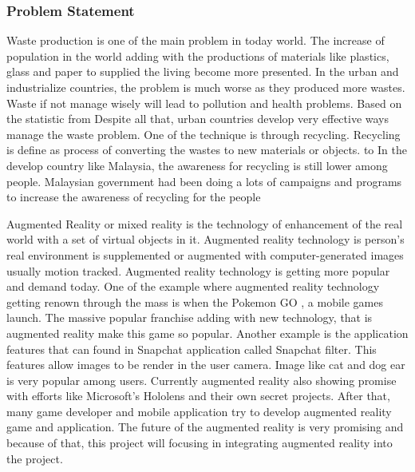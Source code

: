 \documentclass[12pt]{article}
\begin{document}
\par
\subsubsection{Problem Statement}
Waste production is one of the main problem in today world. The increase of population in the world adding with the productions of materials like plastics, glass and paper to supplied the living become more presented. In the urban and industrialize countries, the problem is much worse as they produced more wastes. Waste if not manage wisely will lead to pollution and health problems. Based on the statistic  from Despite all that, urban countries develop  very effective ways manage the waste problem. One of the technique is through recycling. Recycling is define as process of converting the wastes to new materials or objects. to  In the develop country like Malaysia, the awareness for recycling is still lower among people. Malaysian government had been doing a lots of campaigns and programs to increase the awareness of recycling for the people

\par

Augmented Reality or mixed reality is the technology of enhancement of the real world with a set of virtual objects in it. Augmented reality technology is person's real environment is supplemented or augmented with computer-generated images usually motion tracked. Augmented reality technology is getting more popular and demand today. One of the example where augmented reality technology getting renown through the mass is when  the Pokemon GO \cite{PokemonGo}, a mobile games launch. The massive popular franchise adding with new technology, that is augmented reality make this game so popular. Another example is the application features that can found in Snapchat application called Snapchat filter. This features allow images to be render in the user camera. Image like cat and dog ear is very popular among users. Currently augmented reality also showing promise with efforts like Microsoft's Hololens and their own secret projects. After that, many game developer and mobile application try to develop augmented reality game and application. The future of the augmented reality is very promising and because of that, this project will focusing in integrating augmented reality into the project. 

\par 
\end{document}
